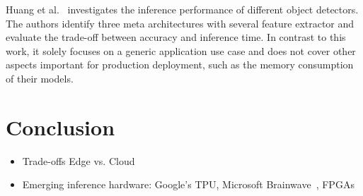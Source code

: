 \documentclass[conference]{IEEEtran}
\begin{document}
Huang et al.~\cite{huang2017speed} investigates the inference performance of different object detectors. The authors identify three meta architectures with several feature extractor and evaluate the trade-off between accuracy and inference time. In contrast to this work, it solely focuses on a generic application use case and does not cover other aspects important for production deployment, such as the memory consumption of their models.




\section{Conclusion}

\begin{itemize}
    \item Trade-offs Edge vs. Cloud
    \item Emerging inference hardware: Google's TPU, Microsoft Brainwave~\cite{brainwave}, FPGAs
\end{itemize}




%





\end{document}
